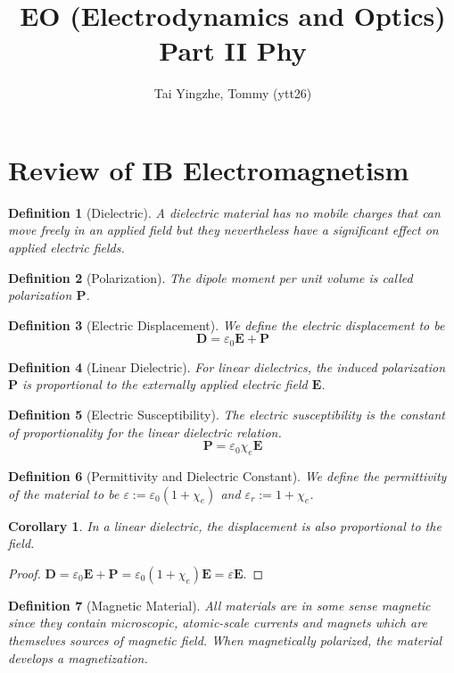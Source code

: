\documentclass[a4paper]{article}
\title{\textbf{EO (Electrodynamics and Optics) Part II Phy}}
\author{Tai Yingzhe, Tommy (ytt26)}
\date{}
\theoremstyle{new}
\newtheorem{defi}{Definition}[section]
\newtheorem{cor}{Corollary}[section]
\begin{document}
\maketitle
\tableofcontents

\newpage
\section{Review of IB Electromagnetism}
\begin{defi}[Dielectric]
A dielectric material has no mobile charges that can move freely in an applied field but they nevertheless have a significant effect on applied electric fields. 
\end{defi}
\begin{defi}[Polarization]
The dipole moment per unit volume is called polarization $\mathbf{P}$.
\end{defi}
\begin{defi}[Electric Displacement]
We define the electric displacement to be
$$\mathbf{D}=\varepsilon_0\mathbf{E}+\mathbf{P}$$
\end{defi}
\begin{defi}[Linear Dielectric]
For linear dielectrics, the induced polarization $\mathbf{P}$ is proportional to the externally applied electric field $\mathbf{E}$.
\end{defi}
\begin{defi}[Electric Susceptibility]
The electric susceptibility is the constant of proportionality for the linear dielectric relation.
$$\mathbf{P}=\varepsilon_0\chi_e\mathbf{E}$$
\end{defi}
\begin{defi}[Permittivity and Dielectric Constant]
We define the permittivity of the material to be $\varepsilon:=\varepsilon_0(1+\chi_e)$ and $\varepsilon_r:=1+\chi_e$.
\end{defi}
\begin{cor}
In a linear dielectric, the displacement is also proportional to the field.
\end{cor}
\begin{proof}
$\mathbf{D}=\varepsilon_0\mathbf{E}+\mathbf{P}=\varepsilon_0(1+\chi_e)\mathbf{E}=\varepsilon\mathbf{E}$.
\end{proof}
\begin{defi}[Magnetic Material]
All materials are in some sense magnetic since they contain microscopic, atomic-scale currents and magnets which are themselves sources of magnetic field. When magnetically polarized, the material develops a magnetization.
\end{defi}
\end{document}
